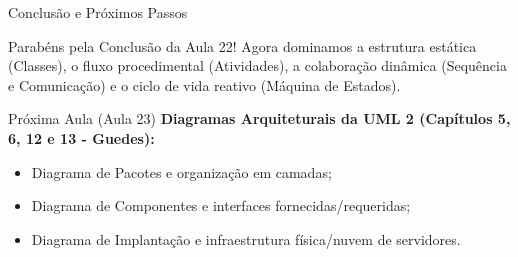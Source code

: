 \documentclass[10pt]{beamer}
\begin{document}
\begin{frame}{Conclusão e Próximos Passos}
    \begin{block}{Parabéns pela Conclusão da Aula 22!}
        Agora dominamos a estrutura estática (Classes), o fluxo procedimental (Atividades), a colaboração dinâmica (Sequência e Comunicação) e o ciclo de vida reativo (Máquina de Estados).
    \end{block}
    \vspace{0.2cm}
    \begin{exampleblock}{Próxima Aula (Aula 23)}
        \textbf{Diagramas Arquiteturais da UML 2 (Capítulos 5, 6, 12 e 13 - Guedes):}
        \begin{itemize}
            \item Diagrama de Pacotes e organização em camadas;
            \item Diagrama de Componentes e interfaces fornecidas/requeridas;
            \item Diagrama de Implantação e infraestrutura física/nuvem de servidores.
        \end{itemize}
    \end{exampleblock}
\end{frame}
\end{document}
